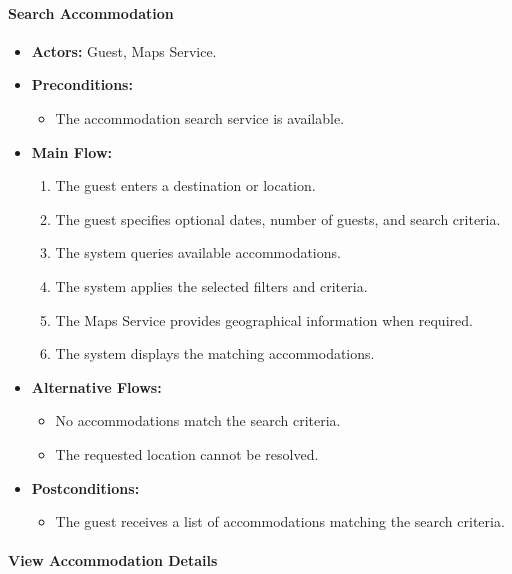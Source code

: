 \paragraph{Search Accommodation}

\begin{itemize}
    \item \textbf{Actors:} Guest, Maps Service.
    
    \item \textbf{Preconditions:}
    \begin{itemize}
        \item The accommodation search service is available.
    \end{itemize}
    
    \item \textbf{Main Flow:}
    \begin{enumerate}
        \item The guest enters a destination or location.
        \item The guest specifies optional dates, number of guests, and search criteria.
        \item The system queries available accommodations.
        \item The system applies the selected filters and criteria.
        \item The Maps Service provides geographical information when required.
        \item The system displays the matching accommodations.
    \end{enumerate}
    
    \item \textbf{Alternative Flows:}
    \begin{itemize}
        \item No accommodations match the search criteria.
        \item The requested location cannot be resolved.
    \end{itemize}
    
    \item \textbf{Postconditions:}
    \begin{itemize}
        \item The guest receives a list of accommodations matching the search criteria.
    \end{itemize}
\end{itemize}


\paragraph{View Accommodation Details}

